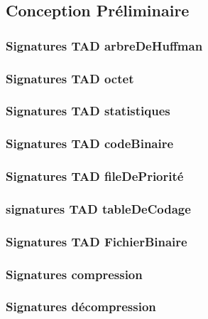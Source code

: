 \subsection{Conception Préliminaire}

\subsubsection{Signatures TAD arbreDeHuffman}


\subsubsection{Signatures TAD octet}


\subsubsection{Signatures TAD statistiques}


\subsubsection{Signatures TAD codeBinaire}


\subsubsection{Signatures TAD fileDePriorité}


\subsubsection{signatures TAD tableDeCodage}


\subsubsection{Signatures TAD FichierBinaire}


\subsubsection{Signatures compression}


\subsubsection{Signatures décompression}

